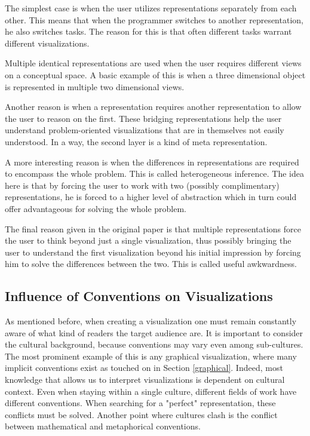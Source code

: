 \documentclass[11pt, a4paper, ngerman, twoside]{article}
\theoremstyle{plain}\newtheorem{Lemma}{Lemma}
\theoremstyle{plain}\newtheorem{Satz}[Lemma]{Satz}
\theoremstyle{definition}\newtheorem{Definition}[Lemma]{Definition}
\theoremstyle{definition}\newtheorem*{Beispiel}{Beispiel}
\theoremstyle{remark}\newtheorem*{Bemerkung}{Bemerkung}
\begin{document}
The simplest case is when the user utilizes representations separately from each other. This means that when the programmer switches to another representation, he also switches tasks. The reason for this is that often different tasks warrant different visualizations.

Multiple identical representations are used when the user requires different views on a conceptual space. A basic example of this is when a three dimensional object is represented in multiple two dimensional views.

Another reason is when a representation requires another representation to allow the user to reason on the first. These bridging representations help the user understand problem-oriented visualizations that are in themselves not easily understood. In a way, the second layer is a kind of meta representation.

A more interesting reason is when the differences in representations are required to encompass the whole problem. This is called heterogeneous inference. The idea here is that by forcing the user to work with two (possibly complimentary) representations, he is forced to a higher level of abstraction which in turn could offer advantageous for solving the whole problem.

The final reason given in the original paper is that multiple representations force the user to think beyond just a single visualization, thus possibly bringing the user to understand the first visualization beyond his initial impression by forcing him to solve the differences between the two. This is called useful awkwardness.

\subsection{Influence of Conventions on Visualizations}

As mentioned before, when creating a visualization one must remain constantly aware of what kind of readers the target audience are. It is important to consider the cultural background, because conventions may vary even among sub-cultures. The most prominent example of this is any graphical visualization, where many implicit conventions exist as touched on in Section \ref{graphical}. Indeed, most knowledge that allows us to interpret visualizations is dependent on cultural context. Even when staying within a single culture, different fields of work have different conventions. When searching for a "perfect" representation, these conflicts must be solved. Another point where cultures clash is the conflict between mathematical and metaphorical conventions.
\end{document}

